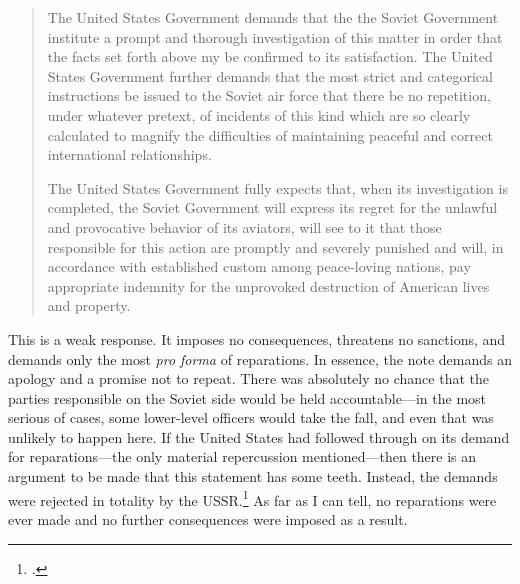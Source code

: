 \documentclass[12pt]{article}
\begin{document}
\begin{quote}
The United States Government demands that the the Soviet Government institute a prompt and thorough investigation of this matter in order that the facts set forth above my be confirmed to its satisfaction. The United States Government further demands that the most strict and categorical instructions be issued to the Soviet air force that there be no repetition, under whatever pretext, of incidents of this kind which are so clearly calculated to magnify the difficulties of maintaining peaceful and correct international relationships.

The United States Government fully expects that, when its investigation is completed, the Soviet Government will express its regret for the unlawful and provocative behavior of its aviators, will see to it that those responsible for this action are promptly and severely punished and will, in accordance with established custom among peace-loving nations, pay appropriate indemnity for the unprovoked destruction of American lives and property.
\end{quote}

This is a weak response. It imposes no consequences, threatens no sanctions, and demands only the most \emph{pro forma} of reparations. In essence, the note demands an apology and a promise not to repeat. There was absolutely no chance that the parties responsible on the Soviet side would be held accountable---in the most serious of cases, some lower-level officers would take the fall, and even that was unlikely to happen here. If the United States had followed through on its demand for reparations---the only material repercussion mentioned---then there is an argument to be made that this statement has some teeth. Instead, the demands were rejected in totality by the USSR.\footcite{salisbury_kremlin_1950} As far as I can tell, no reparations were ever made and no further consequences were imposed as a result.
\end{document}
